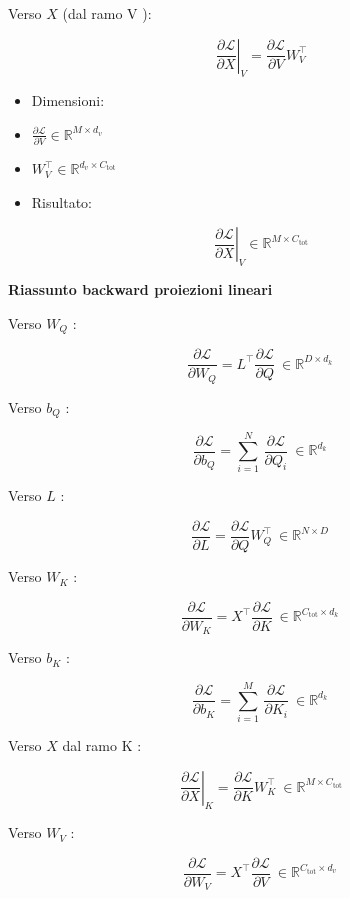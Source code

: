 \documentclass[
  11pt,
]{article}
\begin{document}
Verso \(X\) (dal ramo V ):

\[\left. \ \frac{\partial\mathcal{L}}{\partial X} \right|_{V} = \frac{\partial\mathcal{L}}{\partial V}W_{V}^{\top}\]

\begin{itemize}
\item
  Dimensioni:
\item
  \(\frac{\partial\mathcal{L}}{\partial V} \in \mathbb{R}^{M \times d_{v}}\)
\item
  \(W_{V}^{\top} \in \mathbb{R}^{d_{v} \times C_{\text{tot}}}\)
\item
  Risultato:
\end{itemize}

\[\left. \ \frac{\partial\mathcal{L}}{\partial X} \right|_{V} \in \mathbb{R}^{M \times C_{\text{tot}}}\]

\textbf{Riassunto backward proiezioni lineari}

Verso \(W_{Q}\) :

\[\frac{\partial\mathcal{L}}{\partial W_{Q}} = L^{\top}\frac{\partial\mathcal{L}}{\partial Q}\  \in \mathbb{R}^{D \times d_{k}}\]

Verso \(b_{Q}\) :

\[\frac{\partial\mathcal{L}}{\partial b_{Q}} = \sum_{i = 1}^{N}\,\frac{\partial\mathcal{L}}{\partial Q_{i}}\  \in \mathbb{R}^{d_{k}}\]

Verso \(L\) :

\[\frac{\partial\mathcal{L}}{\partial L} = \frac{\partial\mathcal{L}}{\partial Q}W_{Q}^{\top}\  \in \mathbb{R}^{N \times D}\]

Verso \(W_{K}\) :

\[\frac{\partial\mathcal{L}}{\partial W_{K}} = X^{\top}\frac{\partial\mathcal{L}}{\partial K}\  \in \mathbb{R}^{C_{\text{tot}} \times d_{k}}\]

Verso \(b_{K}\) :

\[\frac{\partial\mathcal{L}}{\partial b_{K}} = \sum_{i = 1}^{M}\,\frac{\partial\mathcal{L}}{\partial K_{i}}\  \in \mathbb{R}^{d_{k}}\]

Verso \(X\) dal ramo K :

\[\left. \ \frac{\partial\mathcal{L}}{\partial X} \right|_{K} = \frac{\partial\mathcal{L}}{\partial K}W_{K}^{\top}\  \in \mathbb{R}^{M \times C_{\text{tot}}}\]

Verso \(W_{V}\) :

\[\frac{\partial\mathcal{L}}{\partial W_{V}} = X^{\top}\frac{\partial\mathcal{L}}{\partial V}\  \in \mathbb{R}^{C_{\text{tot}} \times d_{v}}\]
\end{document}

